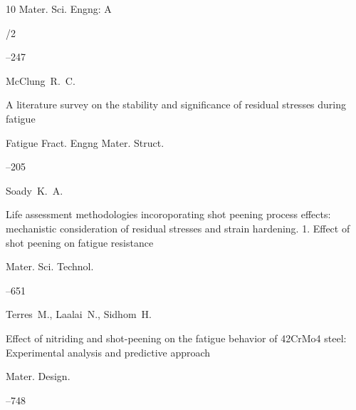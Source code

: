 \begin{thebibliography}{10}
\jour Mater. Sci. Engng: A



/2

--247






\by McClung~R.~C.

\paper A literature survey on the stability and significance of residual stresses during fatigue

\jour Fatigue Fract. Engng Mater. Struct.




--205






\by Soady~K.~A.

\paper Life assessment methodologies incoroporating shot peening process effects: mechanistic consideration of residual stresses and strain hardening. 1. Effect of shot peening on fatigue resistance

\jour Mater. Sci. Technol.




--651






\by Terres~M., Laalai~N., Sidhom~H.

\paper Effect of nitriding and shot-peening on the fatigue behavior of 42CrMo4 steel: Experimental analysis and predictive approach

\jour Mater. Design.




--748





\end{thebibliography}
